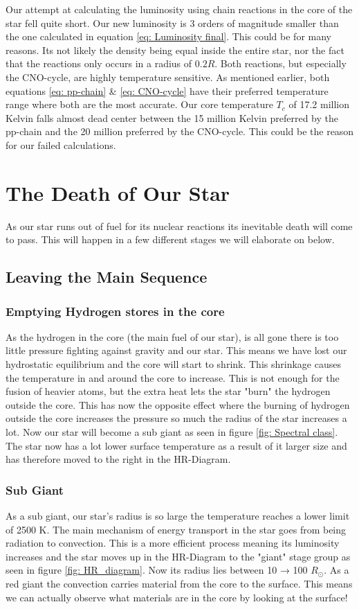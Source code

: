 \documentclass[reprint,english,notitlepage]{revtex4-2}
\begin{document}
Our attempt at calculating the luminosity using chain reactions in the core of the star fell quite short. Our new luminosity is 3 orders of magnitude smaller than the one calculated in equation \ref{eq: Luminosity final}. This could be for many reasons. Its not likely the density being equal inside the entire star, nor the fact that the reactions only occurs in a radius of $ 0.2R $. Both reactions, but especially the CNO-cycle, are highly temperature sensitive. As mentioned earlier, both equations \ref{eq: pp-chain} \& \ref{eq: CNO-cycle} have their preferred temperature range where both are the most accurate. Our core temperature $ T_c $ of 17.2 million Kelvin falls almost dead center between the 15 million Kelvin preferred by the pp-chain and the 20 million preferred by the CNO-cycle. This could be the reason for our failed calculations. 


\section{The Death of Our Star}
As our star runs out of fuel for its nuclear reactions its inevitable death will come to pass. This will happen in a few different stages we will elaborate on below. 

\subsection{Leaving the Main Sequence}

\subsubsection*{Emptying Hydrogen stores in the core}
As the hydrogen in the core (the main fuel of our star), is all gone there is too little pressure fighting against gravity and our star. This means we have lost our hydrostatic equilibrium and the core will start to shrink. This shrinkage causes the temperature in and around the core to increase. This is not enough for the fusion of heavier atoms, but the extra heat lets the star "burn" the hydrogen outside the core. This has now the opposite effect where the burning of hydrogen outside the core increases the pressure so much the radius of the star increases a lot. Now our star will become a sub giant as seen in figure \ref{fig: Spectral class}. The star now has a lot lower surface temperature as a result of it larger size and has therefore moved to the right in the HR-Diagram. 

\subsubsection*{Sub Giant}
As a sub giant, our star's radius is so large the temperature reaches a lower limit of 2500 K. The main mechanism of energy transport in the star goes from being radiation to convection. This is a more efficient process meaning its luminosity increases and the star moves up in the HR-Diagram to the "giant" stage group as seen in figure \ref{fig: HR_diagram}. Now its radius lies between 10 → 100 $ R_{⊙} $. As a red giant the convection carries material from the core to the surface. This means we can actually observe what materials are in the core by looking at the surface!
\end{document}
